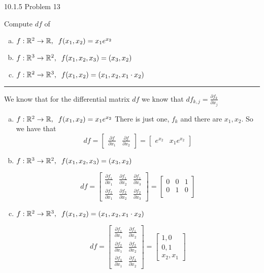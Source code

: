 \documentclass[11pt]{article}
\begin{document}
 10.1.5 Problem 13

Compute $df$ of 
\begin{enumerate}[a.]
    \item $f: \mathbb{R}^2 \to \mathbb{R}, \; \; f(x_1, x_2) = x_1 e^{x_2}$
    \item $f: \mathbb{R}^3 \to \mathbb{R}^2, \; \; f(x_1, x_2, x_3) = (x_3, x_2)$
    \item $f: \mathbb{R}^2 \to \mathbb{R}^3, \; \; f(x_1, x_2) = (x_1, x_2, x_1\cdot x_2)$
\end{enumerate}

\hrule


We know that for the differential matrix $df$ we know that 
$df_{k,j} = \frac{\partial f_k}{\partial x_j}$

\begin{enumerate}[a.]
    \item $f: \mathbb{R}^2 \to \mathbb{R}, \; \; f(x_1, x_2) = x_1 e^{x_2}$
    There is just one, $f_k$ and there are $x_1, x_2$. So we have that 
    $$df = \begin{bmatrix}
        \frac{\partial f}{\partial x_1} & \frac{\partial f}{\partial x_2}
    \end{bmatrix} = 
    \begin{bmatrix}
        e^{x_2} & x_1 e^{x_2}
    \end{bmatrix}$$

    \item $f: \mathbb{R}^3 \to \mathbb{R}^2, \; \; f(x_1, x_2, x_3) = (x_3, x_2)$
    
    $$df = \begin{bmatrix}
        \frac{\partial f_1}{\partial x_1} & \frac{\partial f_1}{\partial x_2} & \frac{\partial f_1}{\partial x_3}\\
        \frac{\partial f_2}{\partial x_1} & \frac{\partial f_2}{\partial x_2} & \frac{\partial f_2}{\partial x_3}
    \end{bmatrix} = 
    \begin{bmatrix}
        0 & 0 & 1 \\
        0 & 1 & 0 \\
    \end{bmatrix}$$

    \item $f: \mathbb{R}^2 \to \mathbb{R}^3, \; \; f(x_1, x_2) = (x_1, x_2, x_1\cdot x_2)$
    
    $$df = \begin{bmatrix}
        \frac{\partial f_1}{\partial x_1} & \frac{\partial f_1}{\partial x_2}\\
        \frac{\partial f_2}{\partial x_1} & \frac{\partial f_2}{\partial x_2}\\
        \frac{\partial f_3}{\partial x_1} & \frac{\partial f_3}{\partial x_2}
    \end{bmatrix} =
    \begin{bmatrix}
        1, 0 \\
        0, 1 \\
        x_2, x_1
    \end{bmatrix}$$

\end{enumerate}
\end{document}
